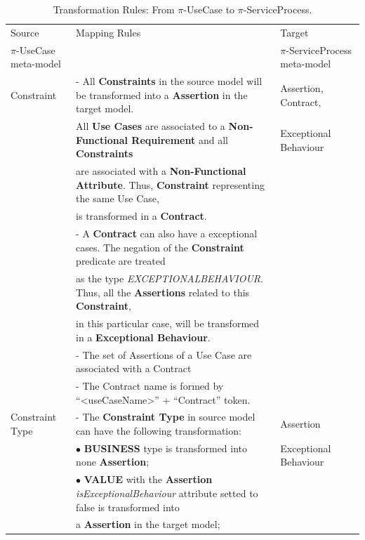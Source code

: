 \begin{table}[ht!]
\tiny
\renewcommand{\arraystretch}{1.3}
\caption{Transformation Rules: From $\pi$-UseCase to $\pi$-ServiceProcess.}
\label{tab:transformationUseCaseToServiceProcess}
\centering
\begin{tabular}{l|l|l}
    \hline
    Source  &  Mapping Rules & Target\\
    $\pi$-UseCase meta-model  &   & $\pi$-ServiceProcess meta-model\\
    \hline
    \hline

	Constraint & - All \textbf{Constraints} in the source model will be transformed
	into a \textbf{Assertion} in the target model.  & Assertion, Contract, \\
	 & All \textbf{Use Cases} are associated to a \textbf{Non-Functional
	 Requirement} and all \textbf{Constraints} & Exceptional Behaviour   \\
	 &are associated with a \textbf{Non-Functional Attribute}. Thus,
	 \textbf{Constraint} representing the same Use Case,  &  \\
	& is transformed in a \textbf{Contract}. & \\
	& - A \textbf{Contract} can also have a exceptional cases. The negation of the
	\textbf{Constraint} predicate are treated &\\

	& as the type \textit{EXCEPTIONALBEHAVIOUR}. Thus, all the \textbf{Assertions}
	related to this \textbf{Constraint},  &\\

	&in this particular case, will be transformed in a \textbf{Exceptional
	Behaviour}.&\\
	& - The set of {\sc Assertions} of a {\sc Use Case} are associated with a
	{\sc Contract} & \\
	& - The {\sc Contract} name is formed by ``<useCaseName>'' + ``Contract''
	token. & \\
\hline


	 Constraint Type & - The \textbf{Constraint Type} in source model can have the
	 following transformation: & Assertion\\

	   &  $\bullet$ \textbf{BUSINESS} type is transformed into none
     \textbf{Assertion}; &  Exceptional Behaviour\\

      &  $\bullet$ \textbf{VALUE} with the
     \textbf{Assertion} \textit{isExceptionalBehaviour} attribute setted to false
      is transformed into& \\
     & a \textbf{Assertion} in the target model;&\\


\end{tabular}
\end{table}
